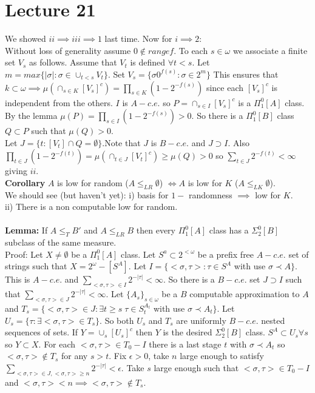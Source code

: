 \documentclass{article}
\begin{document}
      \section{Lecture 21} 
      We showed $ii \implies iii \implies 1$ last time. Now for $i \implies 2$:\\
      Without loss of generality assume $0 \not \in range f$. To each $s \in \omega$ we associate a finite set $V_s$ as follows. Assume that $V_t$ is defined $\forall t< s$. Let $m = max\{|\sigma|: \sigma \in \cup_{t<s} V_t\}$. Set $V_s = \{ \sigma 0^{f(s)} : \sigma \in 2^m\}$  This ensures that $k \subset \omega \implies \mu(\cap_{s\in K} [V_s]^c)= \prod_{s\in K} (1-2^{-f(s)})$ since each $[V_s]^c$ is independent from the others. $I$ is $A-c.e.$ so $P = \cap_{s\in I} [V_s]^c$ is a $\Pi^0_1[A]$ class. By the lemma $\mu(P) = \prod_{s\in I} (1- 2^{-f(s)})> 0$. So there is a $\Pi^0_1[B]$ class $Q \subset P$ such that $\mu(Q) > 0$.\\
      Let $J = \{t : [V_t] \cap Q = \emptyset\}$.Note that $J$ is $B-c.e.$ and $J \supset I$. Also $\prod_{t \in J} (1-2^{-f(t)}) = \mu(\cap_{t\in J} [V_t]^c )\geq \mu(Q) > 0 $ so $\sum_{t \in J} 2^{-f(t)} < \infty$ giving $ii$.\\
      \textbf{Corollary} $A$ is low for random ($A \leq_{LR} \emptyset$) $\iff A$ is low for $K$ ($A \leq_{LK} \emptyset$).\\
      We should see (but haven't yet): i) basis for $1-$ randomness $\implies$ low for $K$.\\
      ii) There is a non computable low for random.\\\\
      \textbf{Lemma:} If $A \leq_T B'$ and $A \leq_{LR} B$ then every $\Pi^0_1[A]$ class has a $\Sigma^0_2[B]$ subclass of the same measure.\\
      Proof: Let $X\neq \emptyset $ be a $\Pi^0_1[A]$ class. Let $S^a \subset 2^{<\omega}$ be a prefix free $A-c.e.$ set of strings such that $X = 2^\omega - [S^A]$. Let $I = \{<\sigma,\tau> : \tau \in S^A $ with use $\sigma \prec A\}$. This is $A-c.e.$ and $\sum_{<\sigma,\tau> \in I} 2^{-|\tau|} < \infty$. So there is a $B-c.e.$ set $J \supset I$ such that $\sum_{<\sigma,\tau> \in J} 2^{-|\tau|}< \infty$. Let $\{A_s\}_{s \in \omega}$ be a $B$ computable approximation to $A$ and $T_s = \{ <\sigma,\tau> \in J : \exists t\geq s\; \tau \in S^{A_t}_t$ with use $\sigma \prec A_t\}$. Let $U_s = \{\tau : \exists <\sigma,\tau> \in T_s\}$. So both $U_s$ and $T_s$ are uniformly $B-c.e.$ nested sequences of sets. If $Y = \cup_s [U_s]^c$ then $Y$ is the desired $\Sigma^0_2[B]$ class. $S^A \subset U_s \forall s$ so $Y \subset X$. For each $<\sigma, \tau> \in T_0 - I$ there is a last stage $t$ with $\sigma \prec A_t$ so $<\sigma,\tau> \not \in T_s$ for any $s > t$. Fix $\epsilon > 0$, take $n$ large enough to satisfy $\sum_{<\sigma,\tau> \in J, <\sigma,\tau> \geq n} 2^{-|\tau|} < \epsilon$. Take $s$ large enough such that $<\sigma,\tau> \in T_0 - I$ and $<\sigma,\tau> < n \implies <\sigma,\tau> \not \in T_s$. \\
\end{document}
